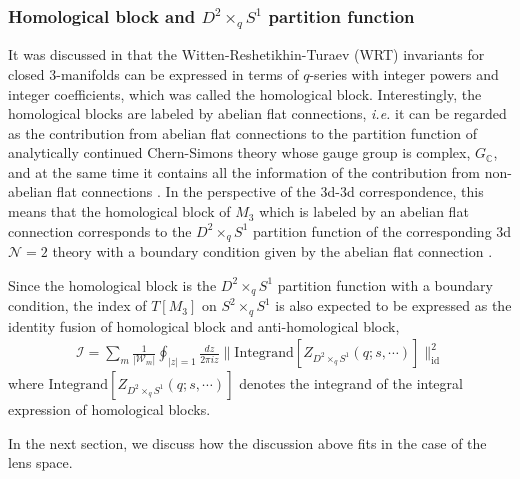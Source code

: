 \documentclass[11pt,hyper,a4paper]{article}
\begin{document}

\subsubsection*{Homological block and $D^2 \times_q S^1$ partition function}

It was discussed in \cite{Gukov-Putrov-Vafa, Gukov-Pei-Putrov-Vafa} that the Witten-Reshetikhin-Turaev (WRT) invariants for closed 3-manifolds can be expressed in terms of $q$-series with integer powers and integer coefficients, which was called the homological block.
Interestingly, the homological blocks are labeled by abelian flat connections, \textit{i.e.} it can be regarded as the contribution from abelian flat connections to the partition function of analytically continued Chern-Simons theory whose gauge group is complex, $G_\mathbb{C}$, and at the same time it contains all the information of the contribution from non-abelian flat connections \cite{Gukov-Marino-Putrov}.
In the perspective of the 3d-3d correspondence, this means that the homological block of $M_3$ which is labeled by an abelian flat connection corresponds to the $D^2 \times_q S^1$ partition function of the corresponding 3d $\mathcal{N}=2$ theory with a boundary condition given by the abelian flat connection \cite{Wfiveknots, DGG}.


Since the homological block is the $D^2 \times_q S^1$ partition function with a boundary condition, the index of $T[M_3]$ on $S^2 \times_q S^1$ is also expected to be expressed as the identity fusion of homological block and anti-homological block,
\begin{align}
\mathcal{I} = \sum_{m} \frac{1}{|\mathcal{W}_m|} \oint_{|z|=1} \frac{dz}{2 \pi i z} \big\| \text{Integrand}[Z_{D^2 \times_q S^1}(q;s, \cdots)] \big\|^2_{\text{id}}	\label{id-fusion}
\end{align}
where $\text{Integrand}[Z_{D^2 \times_q S^1}(q;s, \cdots)]$ denotes the integrand of the integral expression of homological blocks.

In the next section, we discuss how the discussion above fits in the case of the lens space.







\end{document}
